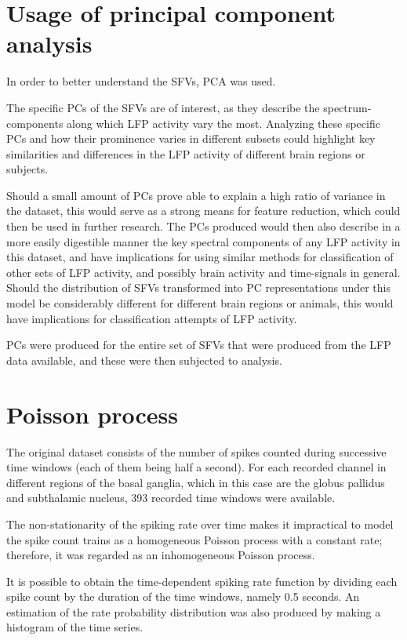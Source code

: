 \documentclass{kththesis}
\begin{document}
\section{Usage of principal component analysis}\label{PCA Methods}

In order to better understand the SFVs, PCA was used.

The specific PCs of the SFVs are of interest, as they describe the spectrum-components along which LFP activity vary the most.
Analyzing these specific PCs and how their prominence varies in different subsets could highlight key similarities and differences in the LFP activity of different brain regions or subjects.

Should a small amount of PCs prove able to explain a high ratio of variance in the dataset, this would serve as a strong means for feature reduction, which could then be used in further research.
The PCs produced would then also describe in a more easily digestible manner the key spectral components of any LFP activity in this dataset, and have implications for using similar methods for classification of other sets of LFP activity, and possibly brain activity and time-signals in general.
Should the distribution of SFVs transformed into PC representations under this model be considerably different for different brain regions or animals, this would have implications for classification attempts of LFP activity.

PCs were produced for the entire set of SFVs that were produced from the LFP data available, and these were then subjected to analysis. 

\section{Poisson process}\label{Poiss Method}

The original dataset consists of the number of spikes counted during successive time windows (each of them being half a second). 
For each recorded channel in different regions of the basal ganglia, which in this case are the globus pallidus and subthalamic nucleus, 393 recorded time windows were available.

The non-stationarity of the spiking rate over time makes it impractical to model the spike count trains as a homogeneous Poisson process with a constant rate; therefore, it was regarded as an inhomogeneous Poisson process.

It is possible to obtain the time-dependent spiking rate function by dividing each spike count by the duration of the time windows, namely 0.5 seconds. 
An estimation of the rate probability distribution was also produced by making a histogram of the time series.
\end{document}

